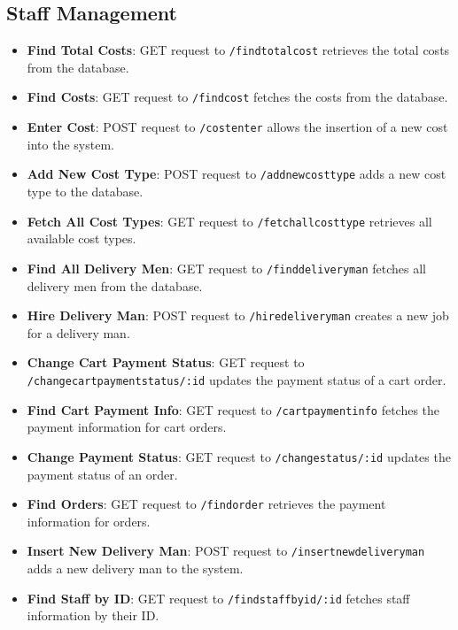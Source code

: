 \subsection*{Staff Management}
\begin{itemize}
\item \textbf{Find Total Costs}: GET request to \texttt{/findtotalcost} retrieves the total costs from the database.
\item \textbf{Find Costs}: GET request to \texttt{/findcost} fetches the costs from the database.
\item \textbf{Enter Cost}: POST request to \texttt{/costenter} allows the insertion of a new cost into the system.
\item \textbf{Add New Cost Type}: POST request to \texttt{/addnewcosttype} adds a new cost type to the database.
\item \textbf{Fetch All Cost Types}: GET request to \texttt{/fetchallcosttype} retrieves all available cost types.
\item \textbf{Find All Delivery Men}: GET request to \texttt{/finddeliveryman} fetches all delivery men from the database.
\item \textbf{Hire Delivery Man}: POST request to \texttt{/hiredeliveryman} creates a new job for a delivery man.
\item \textbf{Change Cart Payment Status}: GET request to \texttt{/changecartpaymentstatus/:id} updates the payment status of a cart order.
\item \textbf{Find Cart Payment Info}: GET request to \texttt{/cartpaymentinfo} fetches the payment information for cart orders.
\item \textbf{Change Payment Status}: GET request to \texttt{/changestatus/:id} updates the payment status of an order.
\item \textbf{Find Orders}: GET request to \texttt{/findorder} retrieves the payment information for orders.
\item \textbf{Insert New Delivery Man}: POST request to \texttt{/insertnewdeliveryman} adds a new delivery man to the system.
\item \textbf{Find Staff by ID}: GET request to \texttt{/findstaffbyid/:id} fetches staff information by their ID.
\end{itemize}